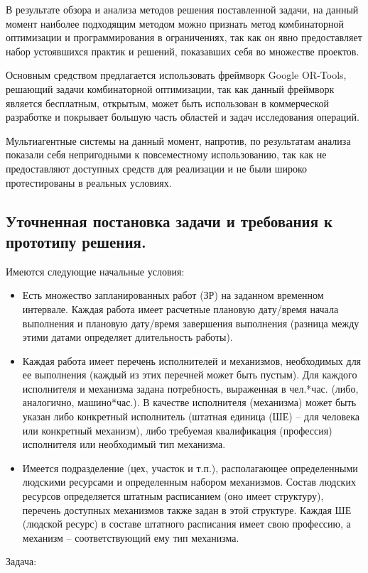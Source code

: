 В результате обзора и анализа методов решения поставленной задачи, на данный момент наиболее подходящим методом можно признать метод комбинаторной оптимизации и программирования в ограничениях, так как он явно предоставляет набор устоявшихся практик и решений, показавших себя во множестве проектов.

Основным средством предлагается использовать фреймворк Google OR-Tools, решающий задачи комбинаторной оптимизации, так как данный фреймворк является бесплатным, открытым, может быть использован в коммерческой разработке и покрывает большую часть областей и задач исследования операций.

Мультиагентные системы на данный момент, напротив, по результатам анализа показали себя непригодными к повсеместному использованию, так как не предоставляют доступных средств для реализации и не были широко протестированы в реальных условиях.


\subsection{Уточненная постановка задачи и требования к прототипу решения.}
Имеются следующие начальные условия:
\begin{itemize}
	\item Есть множество запланированных работ (ЗР) на заданном временном интервале. Каждая работа имеет расчетные плановую дату/время начала выполнения и плановую дату/время завершения выполнения (разница между этими датами определяет длительность работы).
	\item Каждая работа имеет перечень исполнителей и механизмов, необходимых для ее выполнения (каждый из этих перечней может быть пустым). Для каждого исполнителя и механизма задана потребность, выраженная в чел.*час. (либо, аналогично, машино*час.).  В качестве исполнителя (механизма) может быть указан либо конкретный исполнитель (штатная единица (ШЕ) – для человека или конкретный механизм), либо требуемая квалификация (профессия) исполнителя или необходимый тип механизма.
	\item Имеется подразделение (цех, участок и т.п.), располагающее определенными людскими ресурсами и определенным набором механизмов. Состав людских ресурсов определяется штатным расписанием (оно имеет структуру), перечень доступных механизмов также задан в этой структуре. Каждая ШЕ (людской ресурс) в составе штатного расписания имеет свою профессию, а механизм – соответствующий ему тип механизма.
\end{itemize}
	Задача:
	

